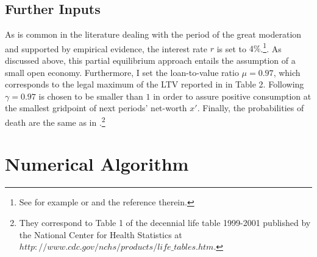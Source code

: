 \documentclass[a4paper,12pt,legno]{article}
\begin{document}
\subsection{Further Inputs}

As is common in the literature dealing with the period of the great moderation and supported by empirical evidence, the interest rate $r$ is set to $4\%$.\footnote{See for example \cite{FV&K2011} or \cite{hintermaier2011} and the reference therein.}. As discussed above, this partial equilibrium approach entails the assumption of a small open economy. Furthermore, I set the loan-to-value ratio $\mu = 0.97$, which corresponds to the legal maximum of the LTV reported in \cite{green2005american} in Table 2. Following \cite{hintermaier2010} $\gamma = 0.97$ is chosen to be smaller than $1$ in order to assure positive consumption at the smallest gridpoint of next periods' net-worth $x'$. Finally, the probabilities of death are the same as in \cite{hintermaier2011}.\footnote{They correspond to Table 1 of the decennial life table 1999-2001 published by the National Center for Health Statistics at $http://www.cdc.gov/nchs/products/life{\_}tables.htm$.} 

\section{Numerical Algorithm}
\end{document}
